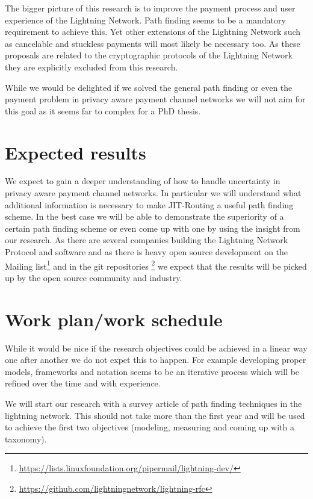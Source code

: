 \documentclass[a4paper]{paper}
\begin{document}
The bigger picture of this research is to improve the payment process and user experience of the Lightning Network.
Path finding seems to be a mandatory requirement to achieve this.
Yet other extensions of the Lightning Network such as cancelable and stuckless payments\cite{gondo2019stucklss} will most likely be necessary too.
As these proposals are related to the cryptographic protocols of the Lightning Network they are explicitly excluded from this research.

While we would be delighted if we solved the general path finding or even the payment problem in privacy aware payment channel networks we will not aim for this goal as it seems far to complex for a PhD thesis.

\section{Expected results}
We expect to gain a deeper understanding of how to handle uncertainty in privacy aware payment channel networks.
In particular we will understand what additional information is necessary to make JIT-Routing a useful path finding scheme. 
In the best case we will be able to demonstrate the superiority of a certain path finding scheme or even come up with one by using the insight from our research.
As there are several companies building the Lightning Network Protocol and software and as there is heavy open source development on the Mailing list\footnote{\url{https://lists.linuxfoundation.org/pipermail/lightning-dev/}} and in the git repositories \footnote{\url{https://github.com/lightningnetwork/lightning-rfc}} we expect that the results will be picked up by the open source community and industry.

\section{Work plan/work schedule}
While it would be nice if the research objectives could be achieved in a linear way one after another we do not expet this to happen.
For example developing proper models, frameworks and notation seems to be an iterative process which will be refined over the time and with experience.

We will start our research with a survey article of path finding techniques in the lightning network.
This should not take more than the first year and will be used to achieve the first two objectives (modeling, measuring and coming up with a taxonomy).
\end{document}
